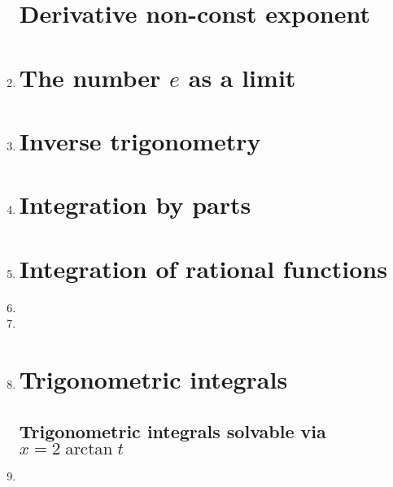 \documentclass{article}
\begin{document}
\begin{enumerate}
\section{Derivative non-const exponent }
\item 
\section{The number $e$ as a limit}
\item 
\section{Inverse trigonometry}
\item 
\section{Integration by parts}
\item 
\section{Integration of rational functions}
\item 
\item 
\item 

\section{Trigonometric integrals}

\subsection{Trigonometric integrals solvable via $x=2\arctan t$}
\item 



\end{enumerate}
\end{document}
